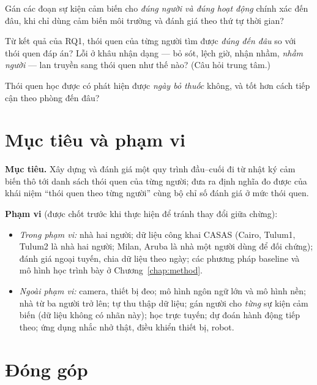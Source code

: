 \begin{description}[leftmargin=1.3cm,style=sameline]
  \item[RQ1] Gán các đoạn sự kiện cảm biến cho \emph{đúng người và đúng hoạt động} chính xác đến
  đâu, khi chỉ dùng cảm biến môi trường và đánh giá theo thứ tự thời gian?
  \item[RQ2] Từ kết quả của RQ1, thói quen của từng người tìm được \emph{đúng đến đâu} so với thói
  quen đáp án? Lỗi ở khâu nhận dạng --- bỏ sót, lệch giờ, nhận nhầm, \emph{nhầm người} --- lan
  truyền sang thói quen như thế nào? (Câu hỏi trung tâm.)
  \item[RQ3] Thói quen học được có phát hiện được \emph{ngày bỏ thuốc} không, và tốt hơn cách tiếp
  cận theo phòng đến đâu?
\end{description}

\section{Mục tiêu và phạm vi}

\textbf{Mục tiêu.} Xây dựng và đánh giá một quy trình đầu--cuối đi từ nhật ký cảm biến thô tới
danh sách thói quen của từng người; đưa ra định nghĩa đo được của khái niệm ``thói quen theo từng
người'' cùng bộ chỉ số đánh giá ở mức thói quen.

\textbf{Phạm vi} (được chốt trước khi thực hiện để tránh thay đổi giữa chừng):
\begin{itemize}
  \item \emph{Trong phạm vi:} nhà hai người; dữ liệu công khai CASAS (Cairo, Tulum1, Tulum2 là nhà
  hai người; Milan, Aruba là nhà một người dùng để đối chứng); đánh giá ngoại tuyến, chia dữ liệu
  theo ngày; các phương pháp baseline và mô hình học trình bày ở Chương~\ref{chap:method}.
  \item \emph{Ngoài phạm vi:} camera, thiết bị đeo; mô hình ngôn ngữ lớn và mô hình nền; nhà từ ba
  người trở lên; tự thu thập dữ liệu; gán người cho \emph{từng} sự kiện cảm biến (dữ liệu không
  có nhãn này); học trực tuyến; dự đoán hành động tiếp theo; ứng dụng nhắc nhở thật, điều khiển
  thiết bị, robot.
\end{itemize}

\section{Đóng góp}

